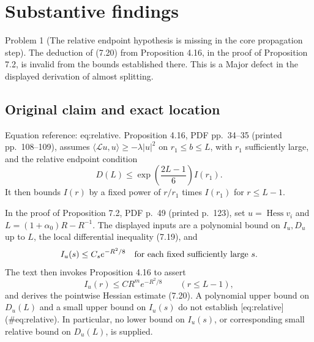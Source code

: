 \documentclass[10pt]{article}
\begin{document}
\section*{Substantive findings}
Problem 1 (The relative endpoint hypothesis is missing in the core propagation step).  The deduction of (7.20) from Proposition 4.16, in the proof of Proposition 7.2, is invalid from the bounds established there. This is a Major defect in the displayed derivation of almost splitting.\par
\subsection*{Original claim and exact location}
Equation reference: eq:relative. Proposition 4.16, PDF pp. 34–35 (printed pp. 108–109), assumes \(\langle\mathcal Lu,u\rangle\ge-\lambda|u|^2\) on \(r_1\le b\le L\), with \(r_1\) sufficiently large, and the relative endpoint condition \[
 D(L)\le \exp\!\left(\frac{2L-1}{6}\right)I(r_1).\] It then bounds \(I(r)\) by a fixed power of \(r/r_1\) times \(I(r_1)\) for \(r\le L-1\).\par
In the proof of Proposition 7.2, PDF p. 49 (printed p. 123), set \(u=\operatorname{Hess}v_i\) and \(L=(1+\alpha_0)R-R^{-1}\). The displayed inputs are a polynomial bound on \(I_u,D_u\) up to \(L\), the local differential inequality (7.19), and \[I_u(s)\le C_s e^{-R^2/8}
 \quad\hbox{for each fixed sufficiently large }s.\] The text then invokes Proposition 4.16 to assert \[I_u(r)\le CR^m e^{-R^2/8}\qquad(r\le L-1),\] and derives the pointwise Hessian estimate (7.20). A polynomial upper bound on \(D_u(L)\) and a small upper bound on \(I_u(s)\) do not establish [eq:relative] (\#eq:relative). In particular, no lower bound on \(I_u(s)\), or corresponding small relative bound on \(D_u(L)\), is supplied.\par
\end{document}

